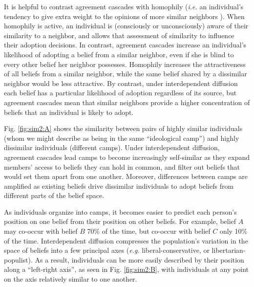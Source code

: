 \documentclass[9pt,twocolumn,twoside,lineno]{pnas-new}
\begin{document}
It is helpful to contrast agreement cascades with homophily (\textit{i.e.} an individual's tendency to give extra weight to the opinions of more similar neighbors \cite{axelrod-1997-dissemination}). When homophily is active, an individual is (consciously or unconsciously) aware of their similarity to a neighbor, and allows that assessment of similarity to influence their adoption decisions. In contrast, agreement cascades increase an individual's likelihood of adopting a belief from a similar neighbor, even if she is blind to every other belief her neighbor possesses. Homophily increases the attractiveness of all beliefs from a similar neighbor, while the same belief shared by a dissimilar neighbor would be less attractive. By contrast, under interdependent diffusion each belief has a particular likelihood of adoption regardless of its source, but agreement cascades mean that similar neighbors provide a higher concentration of beliefs that an individual is likely to adopt. 

Fig. \ref{fig:sim2:A} shows the similarity between pairs of highly similar individuals (whom we might describe as being in the same ``ideological camp'') and highly dissimilar individuals (different camps). Under interdependent diffusion, agreement cascades lead camps to become increasingly self-similar as they expand members’ access to beliefs they can hold in common, and filter out beliefs that would set them apart from one another. Moreover, differences between camps are amplified as existing beliefs drive dissimilar individuals to adopt beliefs from different parts of the belief space.

As individuals organize into camps, it becomes easier to predict each person’s position on one belief from their position on other beliefs. For example, belief $A$ may co-occur with belief $B$ 70\% of the time, but co-occur with belief $C$ only 10\% of the time. Interdependent diffusion compresses the population’s variation in the space of beliefs into a few principal axes (\textit{e.g.} liberal-conservative, or libertarian-populist). As a result, individuals can be more easily described by their position along a “left-right axis”, as seen in Fig. \ref{fig:sim2:B}, with individuals at any point on the axis relatively similar to one another. 
\end{document}

